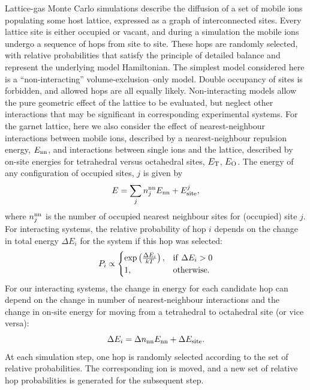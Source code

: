 \documentclass[aps,prb,twocolumn,superscriptaddress,reprint]{revtex4-1}
\begin{document}
Lattice-gas Monte Carlo simulations describe the diffusion of a set of mobile ions populating some host lattice, expressed as a graph of interconnected sites. 
Every lattice site is either occupied or vacant, and during a simulation the mobile ions undergo a sequence of hops from site to site. 
These hops are randomly selected, with relative probabilities that satisfy the principle of detailed balance and represent the underlying model Hamiltonian. 
The simplest model considered here is a ``non-interacting'' volume-exclusion--only model.\cite{Kutner_PhysLett1981} Double occupancy of sites is forbidden, and allowed hops are all equally likely. 
Non-interacting models allow the pure geometric effect of the lattice to be evaluated, but neglect other interactions that may be significant in corresponding experimental systems. 
For the garnet lattice, here we also consider the effect of nearest-neighbour interactions between mobile ions, described by a nearest-neighbour repulsion energy, $E_{\mathrm{nn}}$, and interactions between single ions and the lattice, described by on-site energies for tetrahedral versus octahedral sites, $E_{\mathrm{T}}$, $E_{\mathrm{O}}$. 
The energy of any configuration of occupied sites, $j$ is given by
\begin{equation}
  E = \sum_j n_j^{\mathrm{nn}}E_{\mathrm{nn}} + E_{\mathrm{site}}^j,
\end{equation}
where $n^{\mathrm{nn}}_j$ is the number of occupied nearest neighbour sites for (occupied) site $j$. 
For interacting systems, the relative probability of hop $i$ depends on the change in total energy $\Delta E_i$ for the system if this hop was selected:
\begin{equation}
  P_i \propto 
  \begin{cases}
    \mathrm{exp}\left(\frac{\Delta E_i}{kT}\right),& \mathrm{if}\,\,\Delta E_i > 0 \\
    1,                                        & \mathrm{otherwise.}
  \end{cases}
\end{equation}
For our interacting systems, the change in energy for each candidate hop can depend on the change in number of nearest-neighbour interactions and the change in on-site energy for moving from a tetrahedral to octahedral site (or vice versa):
\begin{equation}
  \Delta E_i = \Delta n_{\mathrm{nn}}E_{\mathrm{nn}} + \Delta E_{\mathrm{site}}.
\end{equation}
At each simulation step, one hop is randomly selected according to the set of relative probabilities. 
The corresponding ion is moved, and a new set of relative hop probabilities is generated for the subsequent step.
\end{document}
